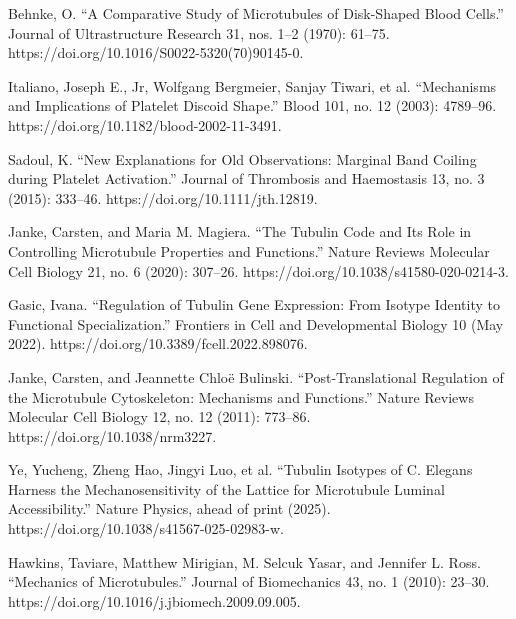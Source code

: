 \begin{thebibliography}{00}
\bibitem[]{}
Behnke, O. “A Comparative Study of Microtubules of Disk-Shaped Blood Cells.” Journal of Ultrastructure Research 31, nos. 1–2 (1970): 61–75. https://doi.org/10.1016/S0022-5320(70)90145-0. %

\bibitem[]{}
Italiano, Joseph E., Jr, Wolfgang Bergmeier, Sanjay Tiwari, et al. “Mechanisms and Implications of Platelet Discoid Shape.” Blood 101, no. 12 (2003): 4789–96. https://doi.org/10.1182/blood-2002-11-3491. %

\bibitem[]{}
Sadoul, K. “New Explanations for Old Observations: Marginal Band Coiling during Platelet Activation.” Journal of Thrombosis and Haemostasis 13, no. 3 (2015): 333–46. https://doi.org/10.1111/jth.12819. %




\bibitem[]{}
Janke, Carsten, and Maria M. Magiera. “The Tubulin Code and Its Role in Controlling Microtubule Properties and Functions.” Nature Reviews Molecular Cell Biology 21, no. 6 (2020): 307–26. https://doi.org/10.1038/s41580-020-0214-3. %

\bibitem[]{}
Gasic, Ivana. “Regulation of Tubulin Gene Expression: From Isotype Identity to Functional Specialization.” Frontiers in Cell and Developmental Biology 10 (May 2022). https://doi.org/10.3389/fcell.2022.898076. %

\bibitem[]{}
Janke, Carsten, and Jeannette Chloë Bulinski. “Post-Translational Regulation of the Microtubule Cytoskeleton: Mechanisms and Functions.” Nature Reviews Molecular Cell Biology 12, no. 12 (2011): 773–86. https://doi.org/10.1038/nrm3227. %


Ye, Yucheng, Zheng Hao, Jingyi Luo, et al. “Tubulin Isotypes of C. Elegans Harness the Mechanosensitivity of the Lattice for Microtubule Luminal Accessibility.” Nature Physics, ahead of print (2025). https://doi.org/10.1038/s41567-025-02983-w. %

\bibitem[]{}
Hawkins, Taviare, Matthew Mirigian, M. Selcuk Yasar, and Jennifer L. Ross. “Mechanics of Microtubules.” Journal of Biomechanics 43, no. 1 (2010): 23–30. https://doi.org/10.1016/j.jbiomech.2009.09.005. %


\end{thebibliography}
